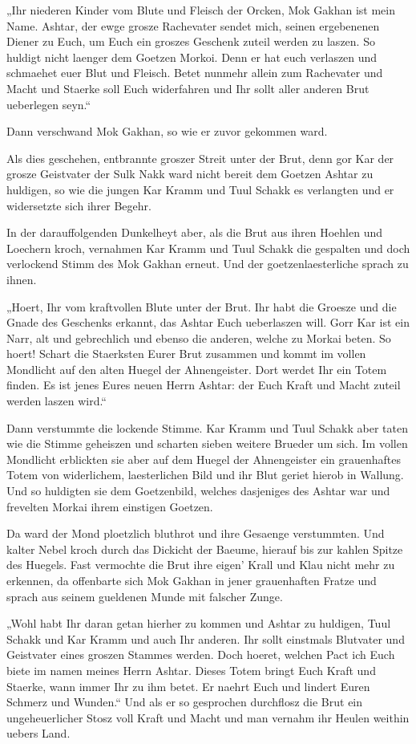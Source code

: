 \documentclass[a5paper,8pt]{book}
\begin{document}
„Ihr niederen Kinder vom Blute und Fleisch der Orcken, Mok Gakhan ist mein Name. Ashtar, der ewge grosze Rachevater sendet mich, seinen ergebenenen Diener zu Euch, um Euch ein groszes Geschenk zuteil werden zu laszen. So huldigt nicht laenger dem Goetzen Morkoi. Denn er hat euch verlaszen und schmaehet euer Blut und Fleisch. Betet nunmehr allein zum Rachevater und Macht und Staerke soll Euch widerfahren und Ihr sollt aller anderen Brut ueberlegen seyn.“

Dann verschwand Mok Gakhan, so wie er zuvor gekommen ward.

Als dies geschehen, entbrannte groszer Streit unter der Brut, denn gor Kar der grosze Geistvater der Sulk Nakk ward nicht bereit dem Goetzen Ashtar zu huldigen, so wie die jungen Kar Kramm und Tuul Schakk es verlangten und er widersetzte sich ihrer Begehr.

In der darauffolgenden Dunkelheyt aber, als die Brut aus ihren Hoehlen und Loechern kroch, vernahmen Kar Kramm und Tuul Schakk die gespalten und doch verlockend Stimm des Mok Gakhan erneut. Und der goetzenlaesterliche sprach zu ihnen.

„Hoert, Ihr vom kraftvollen Blute unter der Brut. Ihr habt die Groesze und die Gnade des Geschenks erkannt, das Ashtar Euch ueberlaszen will. Gorr Kar ist ein Narr, alt und gebrechlich und ebenso die anderen, welche zu Morkai beten. So hoert! Schart die Staerksten Eurer Brut zusammen und kommt im vollen Mondlicht auf den alten Huegel der Ahnengeister. Dort werdet Ihr ein Totem finden. Es ist jenes Eures neuen Herrn Ashtar: der Euch Kraft und Macht zuteil werden laszen wird.“

Dann verstummte die lockende Stimme. Kar Kramm und Tuul Schakk aber taten wie die Stimme geheiszen und scharten sieben weitere Brueder um sich. Im vollen Mondlicht erblickten sie aber auf dem Huegel der Ahnengeister ein grauenhaftes Totem von widerlichem, laesterlichen Bild und ihr Blut geriet hierob in Wallung. Und so huldigten sie dem Goetzenbild, welches dasjeniges des Ashtar war und frevelten Morkai ihrem einstigen Goetzen.

Da ward der Mond ploetzlich bluthrot und ihre Gesaenge verstummten. Und kalter Nebel kroch durch das Dickicht der Baeume, hierauf bis zur kahlen Spitze des Huegels. Fast vermochte die Brut ihre eigen’ Krall und Klau nicht mehr zu erkennen, da offenbarte sich Mok Gakhan in jener grauenhaften Fratze und sprach aus seinem gueldenen Munde mit falscher Zunge.

„Wohl habt Ihr daran getan hierher zu kommen und Ashtar zu huldigen, Tuul Schakk und Kar Kramm und auch Ihr anderen. Ihr sollt einstmals Blutvater und Geistvater eines groszen Stammes werden. Doch hoeret, welchen Pact ich Euch biete im namen meines Herrn Ashtar.
Dieses Totem bringt Euch Kraft und Staerke, wann immer Ihr zu ihm betet. Er naehrt Euch und lindert Euren Schmerz und Wunden.“
Und als er so gesprochen durchflosz die Brut ein ungeheuerlicher Stosz voll Kraft und Macht und man vernahm ihr Heulen weithin uebers Land. 
\end{document}
